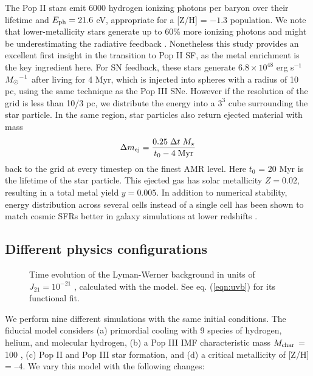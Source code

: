 \documentclass[useAMS,usenatbib]{mn2e}
\begin{document}
The Pop II stars emit 6000 hydrogen ionizing photons per baryon over
their lifetime and $E_{\rm ph} = 21.6$ eV, appropriate for a [Z/H] =
$-1.3$ population.  We note that lower-metallicity stars generate up
to 60\% more ionizing photons and might be underestimating the
radiative feedback \citep{Schaerer03}.  Nonetheless this study
provides an excellent first insight in the transition to Pop II SF, as
the metal enrichment is the key ingredient here.  For SN feedback,
these stars generate $6.8 \times 10^{48}$ erg s$^{-1}$ $\Ms^{-1}$
after living for 4 Myr, which is injected into spheres with a radius
of 10 pc, using the same technique as the Pop III SNe.  However if the
resolution of the grid is less than 10/3 pc, we distribute the energy
into a $3^3$ cube surrounding the star particle.  In the same region,
star particles also return ejected material with mass
%
\begin{equation}
  \label{eqn:SNmass}
  \Delta m_{\rm ej} = \frac{0.25 \; \Delta t \; M_\star} 
         {t_0 - 4\;\mathrm{Myr}}
\end{equation}
back to the grid at every timestep on the finest AMR level.  Here
$t_0$ = 20 Myr is the lifetime of the star particle.  This ejected gas
has solar metallicity $Z = 0.02$, resulting in a total metal yield $y
= 0.005$.  In addition to numerical stability, energy distribution
across several cells instead of a single cell has been shown to match
cosmic SFRs better in galaxy simulations at lower redshifts
\citep{Smith10}.

\subsection{Different physics configurations}
\label{sec:config}

\begin{figure}
  \caption{\label{fig:uvb} Time evolution of the Lyman-Werner
    background in units of $J_{21} = 10^{-21}$ \emis, calculated with
    the \citet{Wise05} model.  See eq. (\ref{eqn:uvb}) for its
    functional fit.}
\end{figure}

We perform nine different simulations with the same initial
conditions.  The fiducial model considers (a) primordial cooling with
9 species of hydrogen, helium, and molecular hydrogen, (b) a Pop III
IMF characteristic mass $M_{\rm char}$ = 100 \Ms, (c) Pop II and Pop
III star formation, and (d) a critical metallicity of [Z/H] = --4.  We
vary this model with the following changes:
\end{document}

